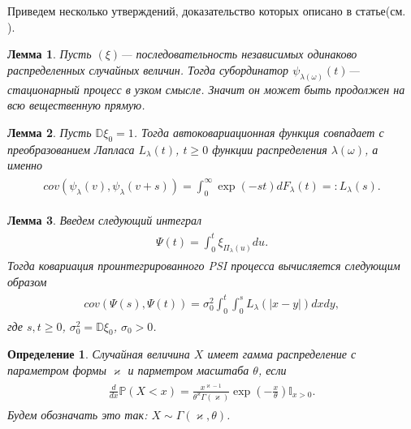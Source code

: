 \documentclass[a4paper,12pt]{article}
\numberwithin{equation}{section}
\newcommand{\dd}{d}
\newtheorem{Lemma}{Лемма}
\newtheorem{Definition}{Определение}
\begin{document}
	Приведем несколько утверждений, доказательство которых описано в статье(см. \cite{Rusakov}). 
	\begin{Lemma}
		Пусть $(\xi)$--- последовательность независимых одинаково распределенных случайных величин. Тогда субординатор $\psi_{\lambda(\omega)}(t)$---  стационарный процесс в узком смысле. Значит он может быть продолжен на всю вещественную прямую. 
	\end{Lemma}
	\begin{Lemma}
		Пусть $\mathbb{D}\xi_0 = 1$. Тогда автоковариационная функция совпадает с преобразованием Лапласа $L_{\lambda}(t)$, $t \geq 0$ функции распределения $\lambda(\omega)$, а именно 
		\begin{align}
		\begin{split}
		cov(\psi_{\lambda}(v), \psi_{\lambda}(v+s)) = \int_0^{\infty} \exp(-st)\dd F_{\lambda}(t) =: L_{\lambda}(s). 
		\end{split}
		\end{align}   
	\end{Lemma}
	\begin{Lemma}
		Введем следующий интеграл 
		\begin{align}
		\begin{split}\label{integralPSI}
		\Psi(t) = \int_0^t \xi_{\Pi_{\lambda}(u)} \dd u. 
		\end{split}
		\end{align}
		Тогда ковариация проинтегрированного PSI процесса вычисляется следующим образом 
		\begin{align}
		\begin{split}
		cov(\Psi(s), \Psi(t)) = \sigma_0^2 \int_0^t\int_0^s L_{\lambda}(|x-y|)\dd x \dd y, 
		\end{split}
		\end{align}
		где $s, t \geq 0$, $\sigma_0^2 = \mathbb{D}\xi_0$, $\sigma_0>0$.  
	\end{Lemma}
	\begin{Definition}
		Случайная величина $X$ имеет гамма распределение с параметром формы $\varkappa$ и парметром масштаба $\theta$, если 
		\begin{align}
		\begin{split}
		\frac{\dd}{\dd x}\mathbb{P}(X<x) = \frac{x^{\varkappa-1}}{\theta^{\varkappa}\Gamma(\varkappa)} \exp\left(-\frac{x}{\theta}\right)\mathbb{I}_{x>0}. 
		\end{split}
		\end{align}
		Будем обозначать это так: $X \sim \Gamma(\varkappa, \theta)$. 
	\end{Definition}
\end{document}
